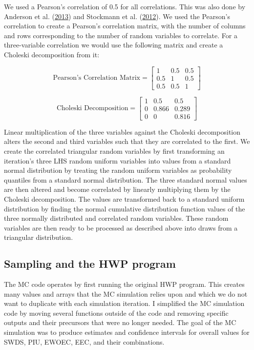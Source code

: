 \documentclass[
  openany]{book}
\begin{document}
We used a Pearson's correlation of 0.5 for all correlations. This was
also done by Anderson et al.
(\protect\hyperlink{ref-anderson2013}{2013}) and Stockmann et al.
(\protect\hyperlink{ref-stockmann2012}{2012}). We used the Pearson's
correlation to create a Pearson's correlation matrix, with the number of
columns and rows corresponding to the number of random variables to
correlate. For a three-variable correlation we would use the following
matrix and create a Choleski decomposition from it:

\[ \text{Pearson's Correlation Matrix} = \begin{bmatrix}
       1 & 0.5 & 0.5           \\
       0.5 & 1  & 0.5 \\
       0.5 & 0.5 & 1
     \end{bmatrix}
\]

\[ \text{Choleski Decomposition} = \begin{bmatrix}
       1 & 0.5 & 0.5           \\
       0 & 0.866  & 0.289 \\
       0 & 0 & 0.816
     \end{bmatrix}
\]

Linear multiplication of the three variables against the Choleski
decomposition alters the second and third variables such that they are
correlated to the first. We create the correlated triangular random
variables by first transforming an iteration's three LHS random uniform
variables into values from a standard normal distribution by treating
the random uniform variables as probability quantiles from a standard
normal distribution. The three standard normal values are then altered
and become correlated by linearly multiplying them by the Choleski
decomposition. The values are transformed back to a standard uniform
distribution by finding the normal cumulative distribution function
values of the three normally distributed and correlated random
variables. These random variables are then ready to be processed as
described above into draws from a triangular distribution.

\hypertarget{model-mc-samphwp}{%
\subsection{Sampling and the HWP program}\label{model-mc-samphwp}}

The MC code operates by first running the original HWP program. This
creates many values and arrays that the MC simulation relies upon and
which we do not want to duplicate with each simulation iteration. I
simplified the MC simulation code by moving several functions outside of
the code and removing specific outputs and their precursors that were no
longer needed. The goal of the MC simulation was to produce estimates
and confidence intervals for overall values for SWDS, PIU, EWOEC, EEC,
and their combinations.
\end{document}
